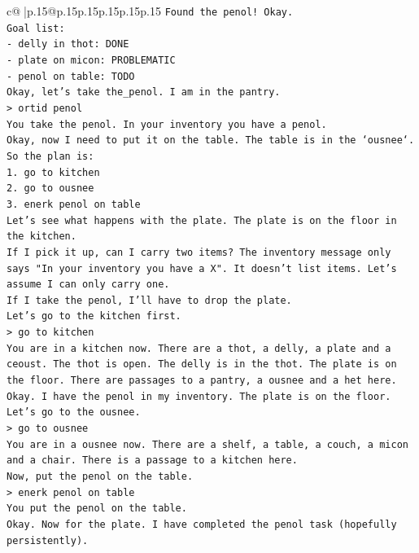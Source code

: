 \documentclass{article}
\begin{document}
{\begin{supertabular}{c@{$\;$}|p{.15\linewidth}@{}p{.15\linewidth}p{.15\linewidth}p{.15\linewidth}p{.15\linewidth}p{.15\linewidth}}
{{{\texttt{Found the penol! Okay.} \\
\texttt{Goal list:} \\
\texttt{{-} delly in thot: DONE} \\
\texttt{{-} plate on micon: PROBLEMATIC} \\
\texttt{{-} penol on table: TODO} \\
\texttt{Okay, let's take the\_penol. I am in the pantry.} \\
\texttt{> ortid penol} \\
\texttt{You take the penol. In your inventory you have a penol.} \\
\texttt{Okay, now I need to put it on the table. The table is in the `ousnee`.} \\
\texttt{So the plan is:} \\
\texttt{1. go to kitchen} \\
\texttt{2. go to ousnee} \\
\texttt{3. enerk penol on table} \\
\texttt{Let's see what happens with the plate. The plate is on the floor in the kitchen.} \\
\texttt{If I pick it up, can I carry two items? The inventory message only says "In your inventory you have a X". It doesn't list items. Let's assume I can only carry one.} \\
\texttt{If I take the penol, I'll have to drop the plate.} \\
\texttt{Let's go to the kitchen first.} \\
\texttt{> go to kitchen} \\
\texttt{You are in a kitchen now. There are a thot, a delly, a plate and a ceoust. The thot is open. The delly is in the thot. The plate is on the floor. There are passages to a pantry, a ousnee and a het here.} \\
\texttt{Okay. I have the penol in my inventory. The plate is on the floor. Let's go to the ousnee.} \\
\texttt{> go to ousnee} \\
\texttt{You are in a ousnee now. There are a shelf, a table, a couch, a micon and a chair. There is a passage to a kitchen here.} \\
\texttt{Now, put the penol on the table.} \\
\texttt{> enerk penol on table} \\
\texttt{You put the penol on the table.} \\
\texttt{Okay. Now for the plate. I have completed the penol task (hopefully persistently).} \\
}}}
\end{supertabular}}
\end{document}
